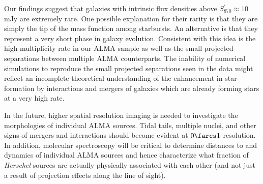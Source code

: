 \documentclass[iop]{emulateapj}
\begin{document}
Our findings suggest that galaxies with intrinsic flux densities above
$S_{870}^\prime \approx 10\,$mJy are extremely rare.  One possible explanation
for their rarity is that they are simply the tip of the mass function among
starbursts.  An alternative is that they represent a very short phase in galaxy
evolution.  Consistent with this idea is the high multiplicity rate in our ALMA
sample as well as the small projected separations between multiple ALMA
counterparts.  The inability of numerical simulations to reproduce the small
projected separations seen in the data might reflect an incomplete theoretical
understanding of the enhancement in star-formation by interactions and mergers
of galaxies which are already forming stars at a very high rate.

In the future, higher spatial resolution imaging is needed to investigate the
morphologies of individual ALMA sources.  Tidal tails, multiple nuclei, and
other signs of mergers and interactions should become evident at $0\farcs1$
resolution.  In addition, molecular spectroscopy will be critical to determine
distances to and dynamics of individual ALMA sources and hence characterize
what fraction of {\it Herschel} sources are actually physically associated with
each other (and not just a result of projection effects along the line of
sight).  %
\end{document}
